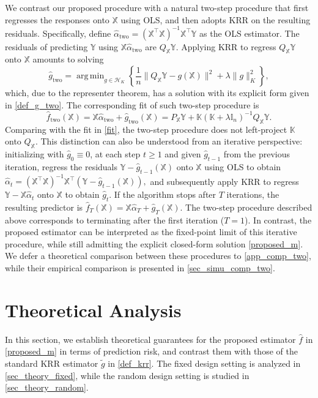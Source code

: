 \documentclass[11pt,twoside]{article}
\DeclareMathOperator*{\argmin}{arg\,min}
\def\KK{\mathbb{K}}
\def\II{\mathbb{I}}
\def\YY{\mathbb{Y}}
\def\XX{\mathbb{X}}
\def\cH{\mathcal H}
\def\wh{\widehat}
\def\wt{\widetilde}
\def\T{\top}
\def\two{\text{two}}
\def\b{\big}
\begin{document}
\begin{remark}\label{rem_twostep}
    We contrast our proposed procedure with a natural two-step procedure that first regresses the responses onto $\XX$ using OLS, and then adopts KRR on the resulting residuals. Specifically, define $\wh \alpha _{\two}=  (\XX^\T \XX)^{-1}  \XX ^\T \YY$ as the OLS estimator.  
    The  residuals of predicting $\YY$  using $\XX \wh \alpha_{\two}$ are  $  Q_  {\XX} \YY$. Applying KRR to regress $ Q_{\XX} \YY$ onto $\XX$  amounts to solving
    \[
        \wh g_{\two}
        = \argmin_{ g\in \cH_K}  \left\{  \frac{1}{n}  \b\|Q_{\XX}\YY -g(\XX) \b\|^2
        +\lambda\|g\|_{K}^2 \right\},
    \]
    which,  due to the representer theorem, has a solution with its explicit form given in \eqref{def_g_two}.
    The corresponding fit of such two-step procedure is 
    \[
        \wh f_{\two}(\XX) = \XX \wh\alpha_{\two} + \wh g_{\two}(\XX) = P_{\XX} \YY  + \KK (\KK + \lambda \II_n)^{-1}Q_{\XX} \YY.
    \]
    Comparing with the fit in \eqref{fit}, the two-step procedure does not left-project $\KK$ onto $Q_{\XX}$. 
    This distinction can also be understood from an iterative perspective: initializing with $\wh g_0\equiv 0$, at each step $t\ge1$ and given $\wh g_{t-1}$ from the previous iteration, regress the residuals $\YY-\wh g_{t-1}(\XX)$ onto $\XX$ using OLS to obtain
    $
        \wh \alpha_t
        =
        (\XX^\T\XX)^{-1}\XX^\T(\YY-\wh g_{t-1}(\XX)),
    $
    and subsequently apply KRR to regress $\YY-\XX\wh \alpha_t$ onto $\XX$ to obtain $\wh g_t$. If the algorithm stops after $T$ iterations, the resulting predictor is $\wh f_T(\XX)  =  \XX \wh  \alpha_T  + \wh g_T(\XX)$.
    The two-step procedure described above corresponds to terminating after the first iteration ($T=1$). In contrast, the proposed estimator can be interpreted as the fixed-point limit of this iterative procedure, while still admitting the explicit closed-form solution \eqref{proposed_m}. We defer a theoretical comparison between these procedures to \cref{app_comp_two}, while their empirical comparison is presented in \cref{sec_simu_comp_two}.
\end{remark}
 

 

\section{Theoretical Analysis}\label{sec_theory_proposed}
In this section, we establish theoretical guarantees for the proposed estimator $\wh f$ in \eqref{proposed_m} in terms of prediction risk, and contrast them with those of the standard KRR estimator $\wt g$ in \eqref{def_krr}. The fixed design setting is analyzed in \cref{sec_theory_fixed}, while the random design setting is studied in \cref{sec_theory_random}.
\end{document}
